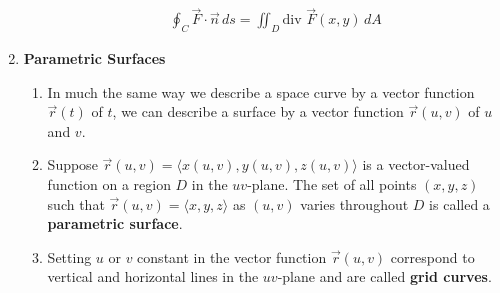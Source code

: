 \documentclass[10pt]{article}
\begin{document}
\begin{multicols}{2}
\begin{enumerate}
\begin{enumerate}
\begin{align*}
            \oint_C \vec{F} \cdot \vec{n} \,ds = \iint_D \text{div }\vec{F}(x,y) \,dA
        \end{align*} 
    \end{enumerate}
    \item \textbf{Parametric Surfaces}
    \begin{enumerate}
        \item In much the same way we describe a space curve by a vector function $\vec{r}(t)$ of $t$, we can describe a surface by a vector function $\vec{r}(u,v)$ of $u$ and $v$.
        \item Suppose $\vec{r}(u,v) = \langle x(u,v), y(u,v), z(u,v) \rangle$ is a vector-valued function on a region $D$ in the $uv$-plane. The set of all points $(x,y,z)$ such that $\vec{r}(u,v) = \langle x,y,z \rangle$ as $(u,v)$ varies throughout $D$ is called a \textbf{parametric surface}.
        \item Setting $u$ or $v$ constant in the vector function $\vec{r}(u,v)$ correspond to vertical and horizontal lines in the $uv$-plane and are called \textbf{grid curves}.
        

\end{enumerate}
\end{enumerate}
\end{multicols}
\end{document}
